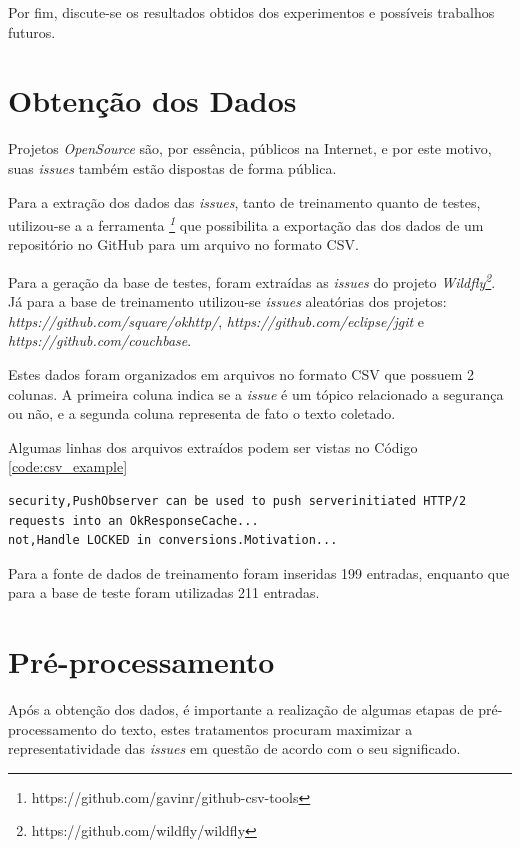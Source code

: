 \documentclass[conference]{IEEEtran}
\begin{document}
Por fim, discute-se os resultados obtidos dos experimentos e possíveis trabalhos futuros.

\section{Obtenção dos Dados}

Projetos \textit{OpenSource} são, por essência, públicos na Internet, e por este motivo, suas \textit{issues} também estão dispostas de forma pública.

Para a extração dos dados das \textit{issues}, tanto de treinamento quanto de testes, utilizou-se a a ferramenta \textit{\footnote{https://github.com/gavinr/github-csv-tools}} que possibilita a exportação das dos dados de um repositório no GitHub para um arquivo no formato CSV.

Para a geração da base de testes, foram extraídas as \textit{issues} do projeto \textit{Wildfly\footnote{https://github.com/wildfly/wildfly}}. Já para a base de treinamento utilizou-se \textit{issues} aleatórias dos projetos: \textit{https://github.com/square/okhttp/}, \textit{https://github.com/eclipse/jgit} e \textit{https://github.com/couchbase}.

Estes dados foram organizados em arquivos no formato CSV que possuem 2 colunas. A primeira coluna indica se a \textit{issue} é um tópico relacionado a segurança ou não, e a segunda coluna representa de fato o texto coletado.

Algumas linhas dos arquivos extraídos podem ser vistas no Código \ref{code:csv_example}

\begin{lstlisting}[caption={CSV Exemplo com Base de Dados},captionpos=b,frame=single,label={code:csv_example}]
security,PushObserver can be used to push serverinitiated HTTP/2 requests into an OkResponseCache...
not,Handle LOCKED in conversions.Motivation...
\end{lstlisting}

Para a fonte de dados de treinamento foram inseridas 199 entradas, enquanto que para a base de teste foram utilizadas 211 entradas.

\section{Pré-processamento}

Após a obtenção dos dados, é importante a realização de algumas etapas de pré-processamento do texto, estes tratamentos procuram maximizar a representatividade das \textit{issues} em questão de acordo com o seu significado.
\end{document}
